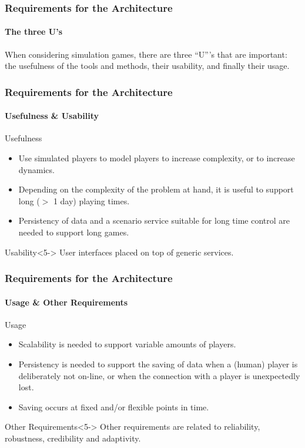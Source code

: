 
\begin{frame}
\frametitle{Requirements for the Architecture}
\framesubtitle{The three U's}
When considering simulation games, there are three ``U'''s
that are important: the \alert{usefulness} of the tools and methods, their
\alert{usability}, and finally their \alert{usage}.
\end{frame}

\begin{frame}
\frametitle{Requirements for the Architecture}
\framesubtitle{Usefulness \& Usability}
\begin{block}{Usefulness}
\begin{itemize}
\item <2->
Use simulated players to model players to increase complexity, or to increase
dynamics.
\item <3->
Depending on the complexity of the problem at hand,
it is useful to support long ($>$ 1 day) playing times.
\item <4->
Persistency of data and a
scenario service suitable for long time control are needed
to support long games.
\end{itemize}
\end{block}
\vfill
\begin{block}{Usability}<5->
User interfaces placed on top of generic services.
\end{block}
\end{frame}

\begin{frame}
\frametitle{Requirements for the Architecture}
\framesubtitle{Usage \& Other Requirements}
\begin{block}{Usage}
\begin{itemize}
\item <2->
\alert{Scalability} is needed to support variable amounts of players.
\item <3->
\alert{Persistency} is needed to support the saving of data
when a (human) player is deliberately not on-line, or when
the connection with a player is unexpectedly lost.
\item <4->
Saving occurs at fixed and/or flexible points in time.
\end{itemize}
\end{block}
\begin{block}{Other Requirements}<5->
Other requirements are related to \alert{reliability}, \alert{robustness},
credibility and adaptivity.
\end{block}
\end{frame}

